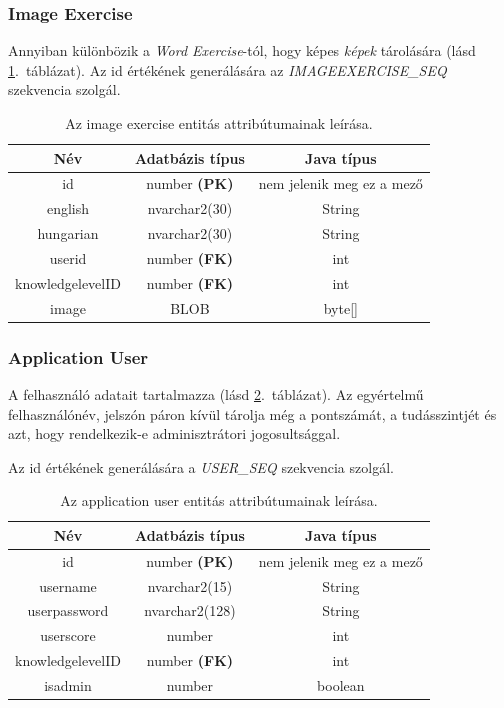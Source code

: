\documentclass[11pt, a4paper]{article}
\begin{document}
    \subsubsection{Image Exercise}
    Annyiban különbözik a \textit{Word Exercise}-tól, hogy képes \emph{képek} tárolására (lásd \ref{tab:image-exercise}.~táblázat). Az id értékének generálására az \textit{IMAGEEXERCISE\_SEQ} szekvencia szolgál.
    
    \begin{table}[!h]
    	\centering
    	\begin{tabular} {|c|c|c|}
    		\hline
    		Név & Adatbázis típus & Java típus \\
    		\hline
    		id & number \textbf{(PK)} & nem jelenik meg ez a mező \\
    		english & nvarchar2(30) & String \\
    		hungarian & nvarchar2(30) & String \\
    		userid & number \textbf{(FK)} & int \\
    		knowledgelevelID & number \textbf{(FK)} & int \\
    		image & BLOB & byte[] \\
    		\hline
    	\end{tabular}
    	\caption{Az image exercise entitás attribútumainak leírása.}
		\label{tab:image-exercise}
    \end{table}
    
    \subsubsection{Application User}
    A felhasználó adatait tartalmazza (lásd \ref{tab:application-user}.~táblázat). Az egyértelmű felhasználónév, jelszón páron kívül tárolja még a pontszámát, a tudásszintjét és azt, hogy rendelkezik-e adminisztrátori jogosultsággal.
    
    Az id értékének generálására a \textit{USER\_SEQ} szekvencia szolgál.
    
    \begin{table}[!h]
    	\centering
    	\begin{tabular} {|c|c|c|}
    		\hline
    		Név & Adatbázis típus & Java típus \\
    		\hline
    		id & number \textbf{(PK)} & nem jelenik meg ez a mező \\
    		username & nvarchar2(15) & String \\
    		userpassword & nvarchar2(128) & String \\
    		userscore & number & int \\
    		knowledgelevelID & number \textbf{(FK)} & int \\
    		isadmin & number & boolean \\
    		\hline
    	\end{tabular}
    	\caption{Az application user entitás attribútumainak leírása.}
		\label{tab:application-user}
    \end{table}
    
\end{document}
